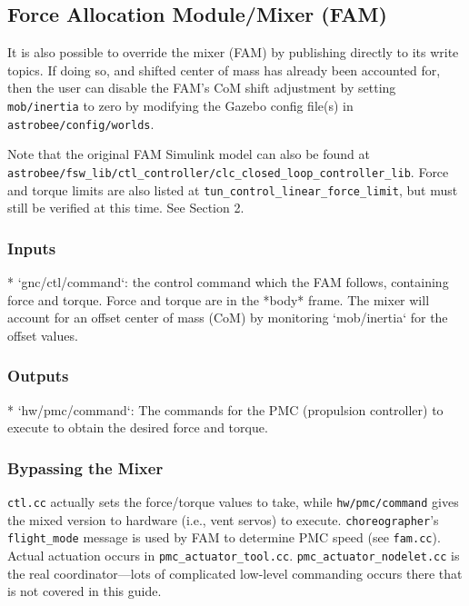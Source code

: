 \documentclass{article}
\begin{document}
\subsection{Force Allocation Module/Mixer (FAM)}

It is also possible to override the mixer (FAM) by publishing directly to its
write topics. If doing so, and shifted center of mass has already been accounted
for, then the user can disable the FAM's CoM shift adjustment by setting
\texttt{mob/inertia}  to zero by modifying the Gazebo config file(s) in
\texttt{astrobee/config/worlds}.

Note that the original FAM Simulink model can also be found at\\
\texttt{astrobee/fsw\_lib/ctl\_controller/clc\_closed\_loop\_controller\_lib}.
Force and torque limits are also listed at
\texttt{tun\_control\_linear\_force\_limit}, but must still be verified at this
time. See Section 2.

\subsubsection{Inputs}
\begin{markdown}
* `gnc/ctl/command`: the control command which the FAM follows, containing force and torque. Force and torque are in the *body* frame. The mixer will account for an offset center of mass (CoM) by monitoring `mob/inertia` for the offset values.
\end{markdown}

\subsubsection{Outputs}
\begin{markdown}
* `hw/pmc/command`: The commands for the PMC (propulsion controller) to execute to obtain the desired force and torque.
\end{markdown}

\subsubsection{Bypassing the Mixer}

\texttt{ctl.cc} actually sets the force/torque values to take, while \texttt{hw/pmc/command} gives the mixed version to hardware (i.e., vent servos) to execute. \texttt{choreographer}'s \texttt{flight\_mode} message is used by FAM to determine PMC speed (see \texttt{fam.cc}). Actual actuation occurs in \texttt{pmc\_actuator\_tool.cc}. \texttt{pmc\_actuator\_nodelet.cc} is the real coordinator---lots of complicated low-level commanding occurs there that is not covered in this guide.
\end{document}
